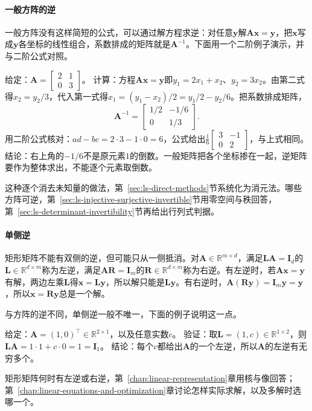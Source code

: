 \paragraph{一般方阵的逆}
一般方阵没有这样简短的公式，可以通过解方程求逆：对任意$\bm y$解$\bm A\bm x=\bm y$，把$\bm x$写成$\bm y$各坐标的线性组合，系数排成的矩阵就是$\bm A^{-1}$。下面用一个二阶例子演示，并与二阶公式对照。
\begin{example}[解方程求逆]
\label{ex:ls-inverse-by-solving}
给定：$\bm A=\left[\begin{smallmatrix}2&1\\0&3\end{smallmatrix}\right]$。
计算：方程$\bm A\bm x=\bm y$即$y_1=2x_1+x_2$、$y_2=3x_2$。由第二式得$x_2=y_2/3$，代入第一式得$x_1=(y_1-x_2)/2=y_1/2-y_2/6$。把系数排成矩阵，
\[
 \bm A^{-1}=\begin{bmatrix}1/2&-1/6\\0&1/3\end{bmatrix}.
\]
用二阶公式核对：$ad-bc=2\cdot3-1\cdot0=6$，公式给出$\frac16\left[\begin{smallmatrix}3&-1\\0&2\end{smallmatrix}\right]$，与上式相同。
结论：右上角的$-1/6$不是原元素$1$的倒数。一般矩阵把各个坐标掺在一起，逆矩阵要作为整体求出，不能逐个元素取倒数。
\end{example}
这种逐个消去未知量的做法，第~\ref{sec:ls-direct-methods}节系统化为消元法。哪些方阵可逆，第~\ref{sec:ls-injective-surjective-invertible}节用零空间与秩回答，第~\ref{sec:ls-determinant-invertibility}节再给出行列式判据。

\paragraph{单侧逆}
矩形矩阵不能有双侧的逆，但可能只从一侧抵消。对$\bm A\in\mathbb R^{m\times d}$，满足$\bm L\bm A=\bm I_d$的$\bm L\in\mathbb R^{d\times m}$称为左逆，满足$\bm A\bm R=\bm I_m$的$\bm R\in\mathbb R^{d\times m}$称为右逆。有左逆时，若$\bm A\bm x=\bm y$有解，两边左乘$\bm L$得$\bm x=\bm L\bm y$，所以解只能是$\bm L\bm y$。有右逆时，$\bm A(\bm R\bm y)=\bm I_m\bm y=\bm y$，所以$\bm x=\bm R\bm y$总是一个解。

与方阵的逆不同，单侧逆一般不唯一，下面的例子说明这一点。
\begin{example}[反例：左逆不唯一]
\label{ex:ls-left-inverse-not-unique}
给定：$\bm A=(1,0)^\top\in\mathbb R^{2\times1}$，以及任意实数$c$。
验证：取$\bm L=(1,c)\in\mathbb R^{1\times2}$，则$\bm L\bm A=1\cdot1+c\cdot0=1=\bm I_1$。
结论：每个$c$都给出$\bm A$的一个左逆，所以$\bm A$的左逆有无穷多个。
\end{example}
矩形矩阵何时有左逆或右逆，第~\ref{chap:linear-representation}章用核与像回答；第~\ref{chap:linear-equations-and-optimization}章讨论怎样实际求解，以及多解时选哪一个。

